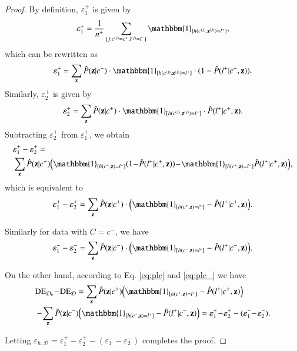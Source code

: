 \documentclass{article}
\begin{document}
\begin{proof}
By definition, $\varepsilon_{1}^{+}$ is given by
\begin{equation*}
\varepsilon_{1}^{+} = \frac{1}{n^{+}}\sum_{\{j:c^{(j)}=c^{+},l^{(j)}=l^{-}\}}\mathbbm{1}_{[h(c^{(j)},\mathbf{z}^{(j)})=l^{+}]},
\end{equation*}
which can be rewritten as
\begin{equation*}
\varepsilon_{1}^{+} = \sum_{\mathbf{z}}\hat{P}(\mathbf{z}|c^{+}) \cdot \mathbbm{1}_{[h(c^{(j)},\mathbf{z}^{(j)})=l^{+}]} \cdot (1-\hat{P}(l^{+}|c^{+},\mathbf{z})).
\end{equation*}
Similarly, $\varepsilon_{2}^{+}$ is given by
\begin{equation*}
\varepsilon_{2}^{+} = \sum_{\mathbf{z}}\hat{P}(\mathbf{z}|c^{+}) \cdot \mathbbm{1}_{[h(c^{(j)},\mathbf{z}^{(j)})=l^{-}]} \cdot \hat{P}(l^{+}|c^{+},\mathbf{z}).
\end{equation*}
Subtracting $\varepsilon_{2}^{+}$ from $\varepsilon_{1}^{+}$, we obtain
\begin{equation*}
\begin{split}
& \varepsilon_{1}^{+} - \varepsilon_{2}^{+} = \\
& \sum_{\mathbf{z}}\hat{P}(\mathbf{z}|c^{+})\Big( \mathbbm{1}_{[h(c^{+},\mathbf{z})=l^{+}]}(1\!-\!\hat{P}(l^{+}|c^{+},\mathbf{z})) \!-\! \mathbbm{1}_{[h(c^{+},\mathbf{z})=l^{-}]}\hat{P}(l^{+}|c^{+},\mathbf{z}) \Big),
\end{split}
\end{equation*}
which is equivalent to 
\begin{equation*}
\varepsilon_{1}^{+} - \varepsilon_{2}^{+} = \sum_{\mathbf{z}}\hat{P}(\mathbf{z}|c^{+}) \cdot \Big( \mathbbm{1}_{[h(c^{+},\mathbf{z})=l^{+}]}-\hat{P}(l^{+}|c^{+},\mathbf{z}) \Big).
\end{equation*}

Similarly for data with $C=c^{-}$, we have
\begin{equation*}
\varepsilon_{1}^{-} - \varepsilon_{2}^{-} = \sum_{\mathbf{z}}\hat{P}(\mathbf{z}|c^{-}) \cdot \Big( \mathbbm{1}_{[h(c^{-},\mathbf{z})=l^{+}]}-\hat{P}(l^{+}|c^{-},\mathbf{z}) \Big).
\end{equation*}

On the other hand, according to Eq. \eqref{eq:plc} and \eqref{eq:plc_} we have
\begin{equation*}
\begin{split}
& \mathrm{DE}_{\mathcal{D}_{h}} \!-\! \mathrm{DE}_{\mathcal{D}} = \sum_{\mathbf{z}} \hat{P}(\mathbf{z}|c^{+}) \Big( \mathbbm{1}_{[h(c^{+},\mathbf{z})=l^{+}]}-\hat{P}(l^{+}|c^{+},\mathbf{z}) \Big) \\
& -\! \sum_{\mathbf{z}} \hat{P}(\mathbf{z}|c^{-}) \Big( \mathbbm{1}_{[h(c^{-},\mathbf{z})=l^{+}]} - \hat{P}(l^{+}|c^{-},\mathbf{z}) \Big) = \varepsilon_{1}^{+} \!-\! \varepsilon_{2}^{+} - (\varepsilon_{1}^{-} \!-\! \varepsilon_{2}^{-}).
\end{split}
\end{equation*}

Letting $\varepsilon_{h,\mathcal{D}} = \varepsilon_{1}^{+} - \varepsilon_{2}^{+} - (\varepsilon_{1}^{-} - \varepsilon_{2}^{-})$ completes the proof.
\end{proof}
\end{document}

